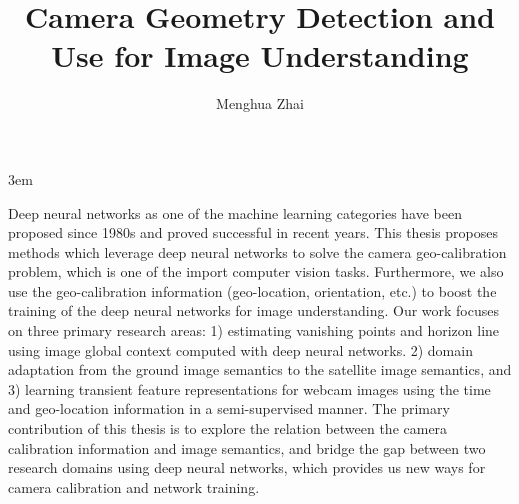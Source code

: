 \documentclass[final]{ukthesis}
\newcommand{\disstitle}{Camera Geometry Detection and Use for Image
Understanding}
\begin{document}
\emergencystretch 3em

\author{Menghua Zhai}
\title{\disstitle}

\abstract
{
  \SingleSpacing
    Deep neural networks as one of the machine learning categories have been proposed
    since 1980s and proved successful in recent years. This thesis proposes methods which
    leverage deep neural networks to solve the camera geo-calibration problem, which is
    one of the import computer vision tasks. Furthermore, we also use the geo-calibration
    information (geo-location, orientation, etc.) to boost the training of the deep neural
    networks for image understanding.
    Our work focuses on three primary research areas: 1) estimating vanishing points
    and horizon line using image global context computed with deep neural networks. 2)
    domain adaptation from the ground image semantics to the satellite image semantics,
    and 3) learning transient feature representations for webcam images using the time
    and geo-location information in a semi-supervised manner.
    The primary contribution of this thesis is to explore the relation between the
    camera calibration information and image semantics, and bridge the gap between
    two research domains using deep neural networks, which provides us new ways for
    camera calibration and network training.
}


\frontmatter
\maketitle



\tableofcontents\clearpage

\mainmatter


\backmatter




\end{document}

